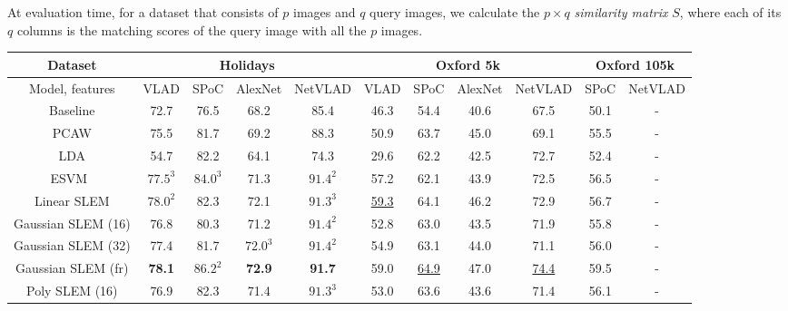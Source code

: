 At evaluation time, for a dataset that consists of $p$ images and $q$ query images, we calculate the $p\times q$ \emph{similarity matrix} $S$, where each of its $q$ columns is the matching scores of the query image with all the $p$ images. 

\begin{table*}[t!]
\begin{center}
\setlength{\tabcolsep}{.2em}
\begin{tabular}{c@{\hskip 1em}cccc@{\hskip 1em}cccc@{\hskip 1em}cc}%
\toprule
Dataset & \multicolumn{4}{c}{\textbf{Holidays}} & \multicolumn{4}{c}{\textbf{Oxford 5k}} & \multicolumn{2}{c}{\textbf{Oxford 105k}} \\%
\midrule
Model, features & VLAD  & SPoC & AlexNet & NetVLAD & VLAD & SPoC & AlexNet & NetVLAD & SPoC & NetVLAD\\%
\midrule
Baseline            & 72.7 & 76.5 & 68.2  &  85.4 & 46.3 & 54.4 & 40.6 & 67.5 & 50.1 & - \\%
PCAW                & 75.5 & 81.7 & 69.2 & 88.3 & 50.9  & 63.7 & 45.0 & 69.1 & 55.5 & - \\%
LDA                 & 54.7 & 82.2 & 64.1 & 74.3 & 29.6  & 62.2 & 42.5 & 72.7 & 52.4 & - \\
ESVM~\cite{ZePe15}  & $77.5^3$ & $84.0^3$ & 71.3 & $91.4^2$ & 57.2  & 62.1 & 43.9 & 72.5 & 56.5 & - \\%
Linear SLEM         & $78.0^2$ & 82.3 & 72.1 & $91.3^3$ & \ul{59.3}  & 64.1 & 46.2 & 72.9 & 56.7 & - \\%
Gaussian SLEM (16)  & 76.8 & 80.3 & 71.2 & $91.4^2$ & 52.8 & 63.0 & 43.5 & 71.9 & 55.8 & - \\
Gaussian SLEM (32)  & 77.4 & 81.7 & $72.0^3$ & $91.4^2$ & 54.9 & 63.1 & 44.0 & 71.1 & 56.0 & - \\
Gaussian SLEM (fr)  & \bf{78.1} & $86.2^2$ & \bf{72.9} & \bf{91.7} & 59.0   & \ul{64.9} & 47.0 & \ul{74.4} & 59.5 & - \\%
Poly SLEM (16)      & 76.9 & 82.3 & 71.4 & $91.3^3$ & 53.0 & 63.6 & 43.6 & 71.4 & 56.1 & - \\

\end{tabular}
\end{center}
\end{table*}
